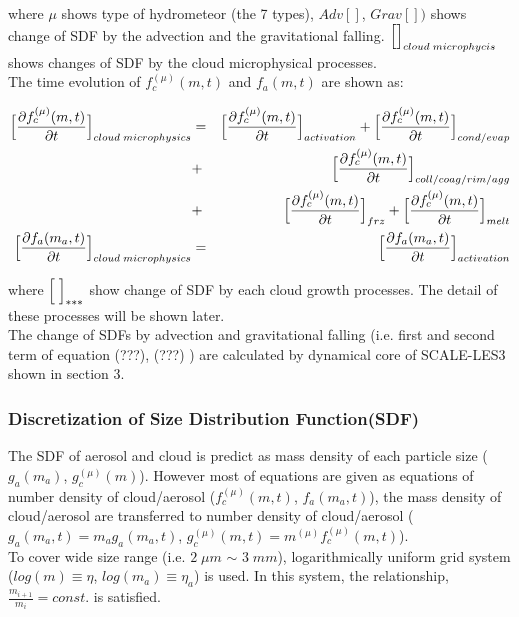 where $\mu$ shows type of hydrometeor (the 7 types), $Adv[]$, $Grav[])$ shows change of SDF by the advection and the gravitational falling. $\Bigl[ \Bigr]_{cloud\;microphycis}$ shows changes of SDF by the cloud microphysical processes.\\
The time evolution of $f_{c}^{(\mu)}(m,t)$ and $f_{a}(m,t)$ are shown as:

\begin{eqnarray}
\Bigl[ \frac{\partial f_{c}^{(\mu)}(m,t)}{\partial t}\Bigl]_{cloud\;microphysics}&=&\Bigl[\frac{\partial f_{c}^{(\mu)}(m,t)}{\partial t}\Bigr]_{activation}+\Bigl[\frac{\partial f_{c}^{(\mu)}(m,t)}{\partial t}\Bigr]_{cond/evap}\nonumber\\
&+&\Bigl[\frac{\partial f_{c}^{(\mu)}(m,t)}{\partial t}\Bigr]_{coll/coag/rim/agg}\nonumber\\
&+&\Bigl[\frac{\partial f_{c}^{(\mu)}(m,t)}{\partial t}\Bigr]_{frz}+\Bigl[\frac{\partial f_{c}^{(\mu)}(m,t)}{\partial t}\Bigr]_{melt}\nonumber\\
\Bigl[ \frac{\partial f_{a}(m_{a},t)}{\partial t}\Bigl]_{cloud\;microphysics}&=&\Bigl[\frac{\partial f_{a}(m_{a},t)}{\partial t}\Bigr]_{activation}\nonumber
\end{eqnarray}

where $\Bigl[\;\Bigr]_{***}$ show change of SDF by each cloud growth processes. The detail of these processes will be shown later.\\
 The change of SDFs by advection and gravitational falling (i.e. first and second term of equation (???), (???) ) are calculated by dynamical core of SCALE-LES3 shown in section 3.


\subsubsection{Discretization of Size Distribution Function(SDF)}
The SDF of aerosol and cloud is predict as mass density of each particle size ($g_{a}(m_{a})$, $g_{c}^{(\mu)}(m)$). However most of equations are given as equations of number density of cloud/aerosol ($f_{c}^{(\mu)}(m,t)$, $f_{a}(m_{a},t)$), the mass density of cloud/aerosol are transferred to number density of cloud/aerosol ($g_{a}(m_{a},t)=m_{a}g_{a}(m_{a},t)$, $g_{c}^{(\mu)}(m,t)=m^{(\mu)}f_{c}^{(\mu)}(m,t)$).\\
To cover wide size range (i.e. $2\;\mu m$ $\sim$ $3\;mm$), logarithmically uniform grid system ($log(m)\equiv \eta$, $log(m_{a})\equiv \eta_{a}$) is used. In this system, the relationship, $\frac{m_{i+1}}{m_{i}}=const.$ is satisfied.

